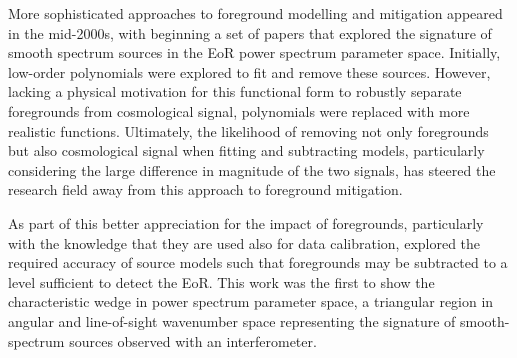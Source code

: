 More sophisticated approaches to foreground modelling and mitigation appeared in the mid-2000s, with \cite{2009ApJ...695..183B} beginning a set of papers that explored the signature of smooth spectrum sources in the EoR power spectrum parameter space. Initially, low-order polynomials were explored to fit and remove these sources. However, lacking a physical motivation for this functional form to robustly separate foregrounds from cosmological signal, polynomials  were replaced with more realistic functions. Ultimately, the likelihood of removing not only foregrounds but also cosmological signal when fitting and subtracting models, particularly considering the large difference in magnitude of the two signals, has steered the research field away from this approach to foreground mitigation.

As part of this better appreciation for the impact of foregrounds, particularly with the knowledge that they are used also for data calibration, \cite{datta10} explored the required accuracy of source models such that foregrounds may be subtracted to a level sufficient to detect the EoR. This work was the first to show the characteristic wedge in power spectrum parameter space, a triangular region in angular and line-of-sight wavenumber space representing the signature of smooth-spectrum sources observed with an interferometer.


